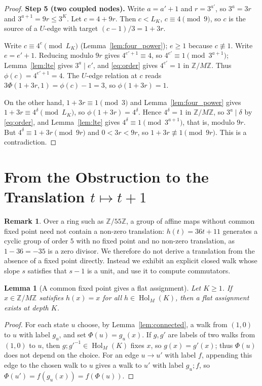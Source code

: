 \documentclass[11pt,reqno,oneside]{amsart}
\theoremstyle{plain}
\newtheorem{lemma}[theorem]{Lemma}
\theoremstyle{definition}
\newtheorem{remark}[theorem]{Remark}
\numberwithin{equation}{section}
\newcommand{\Z}{\mathbb{Z}}
\newcommand{\ZM}{\Z/M\Z}
\DeclareMathOperator{\Hol}{Hol}
\newcommand{\then}{\mathbin{;}}
\begin{document}
\begin{proof}
\medskip\noindent\textbf{Step 5 (two coupled nodes).} Write $a=a'+1$ and $r=3^{a'}$, so $3^a=3r$ and $3^{a+1}=9r\le3^K$. Let $c=4+9r$. Then $c<L_K$, $c\equiv4\pmod 9$, so $c$ is the source of a $U$-edge with target $(c-1)/3=1+3r$.

Write $c\equiv4^{e}\pmod{L_K}$ (Lemma~\ref{lem:four_power}); $e\ge1$ because $c\not\equiv1$. Write $e=e'+1$. Reducing modulo $9r$ gives $4^{e'+1}\equiv4$, so $4^{e'}\equiv1\pmod{3^{a+1}}$; Lemma~\ref{lem:lte} gives $3^a\mid e'$, and \eqref{eq:order} gives $4^{e'}=1$ in $\ZM$. Thus $\phi(c)=4^{e'+1}=4$. The $U$-edge relation at $c$ reads $3\Phi(1+3r,1)=\phi(c)-1=3$, so $\phi(1+3r)=1$.

On the other hand, $1+3r\equiv1\pmod 3$ and Lemma~\ref{lem:four_power} gives $1+3r\equiv4^{\delta}\pmod{L_K}$, so $\phi(1+3r)=4^{\delta}$. Hence $4^{\delta}=1$ in $\ZM$, so $3^a\mid\delta$ by \eqref{eq:order}, and Lemma~\ref{lem:lte} gives $4^{\delta}\equiv1\pmod{3^{a+1}}$, that is, modulo $9r$. But $4^{\delta}\equiv1+3r\pmod{9r}$ and $0<3r<9r$, so $1+3r\not\equiv1\pmod{9r}$. This is a contradiction.
\end{proof}

\section{From the Obstruction to the Translation \texorpdfstring{$t\mapsto t+1$}{t -> t+1}}\label{sec:translation}

\begin{remark}\label{rem:z55}
Over a ring such as $\Z/55\Z$, a group of affine maps without common fixed point need not contain a non-zero translation: $h(t)=36t+11$ generates a cyclic group of order $5$ with no fixed point and no non-zero translation, as $1-36=-35$ is a zero divisor. We therefore do not derive a translation from the absence of a fixed point directly. Instead we exhibit an explicit closed walk whose slope $s$ satisfies that $s-1$ is a unit, and use it to compute commutators.
\end{remark}

\begin{lemma}[A common fixed point gives a flat assignment]\label{lem:fixed_flat}
Let $K\ge1$. If $x\in\ZM$ satisfies $h(x)=x$ for all $h\in\Hol_M(K)$, then a flat assignment exists at depth $K$.
\end{lemma}
\begin{proof}
For each state $u$ choose, by Lemma~\ref{lem:connected}, a walk from $(1,0)$ to $u$ with label $g_u$, and set $\Phi(u)=g_u(x)$. If $g,g'$ are labels of two walks from $(1,0)$ to $u$, then $g\then g'^{-1}\in\Hol_M(K)$ fixes $x$, so $g(x)=g'(x)$; thus $\Phi(u)$ does not depend on the choice. For an edge $u\to u'$ with label $f$, appending this edge to the chosen walk to $u$ gives a walk to $u'$ with label $g_u\then f$, so $\Phi(u')=f(g_u(x))=f(\Phi(u))$.
\end{proof}
\end{document}
